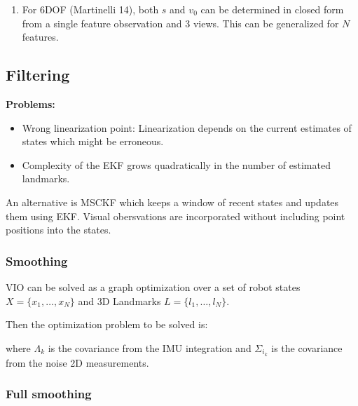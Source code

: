 \documentclass[10pt,a4paper]{scrartcl}
\begin{document}
\begin{multicols*}{2}
\begin{enumerate}
\item For 6DOF (Martinelli 14), both $s$ and $v_0$ can be determined in closed form from a single feature observation and 3 views. This can be generalized for $N$ features.
\end{enumerate}

\subsection{Filtering}


\textbf{Problems:}
\begin{itemize}
\item Wrong linearization point: Linearization depends on the current estimates of states which might be erroneous.
\item Complexity of the EKF grows quadratically in the number of estimated landmarks.
\end{itemize}

An alternative is MSCKF which keeps a window of recent states and updates them using EKF. Visual obersvations are incorporated without including point positions into the states.

\subsubsection{Smoothing}

VIO can be solved as a graph optimization over a set of robot states $X=\{x_1,\ldots,x_N\}$ and 3D Landmarks $L =\{l_1,\ldots,l_N\}$.



Then the optimization problem to be solved is:


where $\Lambda_k$ is the covariance from the IMU integration and $\Sigma_{i_k}$ is the covariance from the noise 2D measurements.

\subsubsection{Full smoothing}


\end{multicols*}
\end{document}

